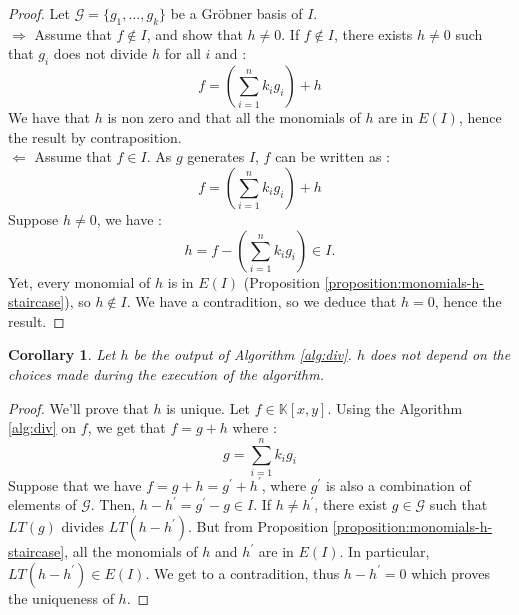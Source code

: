 \documentclass{article}
\newtheorem{corollary}{Corollary}[theorem]
\begin{document}
\begin{proof}
    Let $\mathscr{G} = \{g_{1}, ..., g_{k}\}$ be a Gröbner basis of $I$. \\
    $\Rightarrow$ Assume that $f \notin I$, and show that $h \neq 0$. If $f \notin I$, there exists $h \neq 0$ such that $g_{i}$ does not divide $h$ for all $i$ and : 
    \begin{displaymath}
        f = \left( \sum_{i = 1}^{n} k_{i}g_{i} \right) + h
    \end{displaymath}
    We have that $h$ is non zero and that all the monomials of $h$ are in $E(I)$, hence the result by contraposition. \\
    $\Leftarrow$ Assume that $f \in I$. As $g$ generates $I$, $f$ can be written as :
    \begin{displaymath}
        f = \left( \sum_{i = 1}^{n} k_{i}g_{i} \right) + h
    \end{displaymath}
    Suppose $h \neq 0$, we have : 
    \begin{displaymath}
        h = f - \left( \sum_{i = 1}^{n} k_{i}g_{i} \right) \in I. 
    \end{displaymath}
    Yet, every monomial of $h$ is in $E(I)$ (Proposition \ref{proposition:monomials-h-staircase}), so $h \notin I$. We have a contradition, so we deduce that $h = 0$, hence the result.
\end{proof}

\begin{corollary}
    Let $h$ be the output of Algorithm \ref{alg:div}. $h$ does not depend on the choices made during the execution of the algorithm. 
\end{corollary}

\begin{proof}
    We'll prove that $h$ is unique. Let $f \in \mathbb{K}[x, y]$. Using the Algorithm \ref{alg:div} on $f$, we get that $f = g + h$ where : 
    \begin{displaymath}
        g = \sum_{i = 1}^{n} k_{i}g_{i} 
    \end{displaymath}
    Suppose that we have $f = g + h = g^{\prime} + h^{\prime}$, where $g^{\prime}$ is also a combination of elements of $\mathscr{G}$. Then, $h - h^{\prime} = g^{\prime} - g \in I$. If $h \neq h^{\prime}$, there exist $g \in \mathscr{G}$ such that $LT(g)$ divides $LT(h - h^{\prime})$. But from Proposition \ref{proposition:monomials-h-staircase}, all the monomials of $h$ and $h^{\prime}$ are in $E(I)$. In particular, $LT(h - h^{\prime}) \in E(I)$. We get to a contradition, thus $h - h^{\prime} = 0$ which proves the uniqueness of $h$.
\end{proof}
\end{document}
